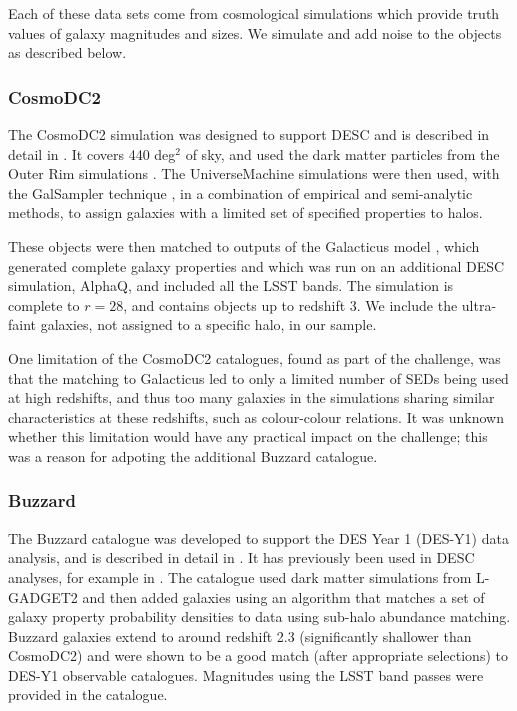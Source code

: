 \documentclass[twocolumn,twocolappendix]{aastex63}
\begin{document}
Each of these data sets come from cosmological simulations which provide truth values of galaxy magnitudes
and sizes.  We simulate and add noise to the objects as described below.

\subsubsection{CosmoDC2} \label{sec:cosmodc2}

The CosmoDC2 simulation was designed to support DESC and 
is described in detail in \citet{cosmodc2}.  It covers 440
deg${}^2$ of sky, and used the dark matter particles from the Outer Rim
simulations \citep{outer_rim}.  The UniverseMachine \citep{universe_machine}
simulations were then used, with the GalSampler technique \citep{galsampler},
in a combination of empirical and semi-analytic
methods, to assign galaxies with a limited set of specified properties to halos.

These objects were then matched to outputs of the Galacticus model
\citep{galacticus}, which generated complete galaxy properties and which was run
on an additional DESC simulation, AlphaQ, and included all the LSST bands.  The
simulation is complete to $r=28$, and contains objects up to redshift 3.  We
include the ultra-faint galaxies, not assigned to a specific halo, in our sample.

One limitation of the CosmoDC2 catalogues, found as part of the challenge,
was that the matching to Galacticus led to only a limited number of SEDs being
used at high redshifts, and thus too many galaxies in the simulations sharing
similar characteristics at these redshifts, such as colour-colour relations.
It was unknown whether this limitation would have any practical impact on the challenge;
this was a reason for adpoting the additional Buzzard catalogue.

\subsubsection{Buzzard}

The Buzzard catalogue was developed to support the DES Year 1 (DES-Y1)
data analysis, and is described in detail in \citet{buzzard}.
It has previously been used in DESC analyses, for example in \citet{dc1_pz}.
The catalogue used dark
matter simulations from L-GADGET2 \cite{gadget2} and then added galaxies using
an algorithm that matches a set of galaxy
property probability densities to data using sub-halo abundance matching. 
Buzzard galaxies extend to around redshift 2.3 (significantly shallower than CosmoDC2)
and were shown to be a good
match (after appropriate selections) to DES-Y1 observable catalogues.  Magnitudes
using the LSST band passes were provided in the catalogue.
\end{document}
